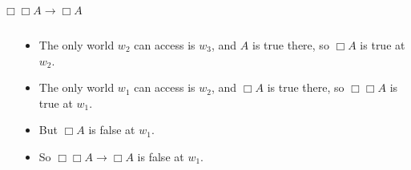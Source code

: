 \documentclass[
  14pt,
  letterpaper,
  ignorenonframetext,
  aspectratio=169,
]{beamer}
\begin{document}
\begin{frame}{\(\Box \Box A \rightarrow \Box A\)}
\protect\hypertarget{box-box-a-rightarrow-box-a}{}
\begin{columns}
    \begin{column}{0.45\textwidth}
    \end{column}
    \begin{column}{0.5\textwidth}
    \begin{itemize}
    \item The only world $w_2$ can access is $w_3$, and $A$ is true there, so $\Box A$ is true at $w_2$.
    \item The only world $w_1$ can access is $w_2$, and $\Box A$ is true there, so $\Box \Box A$ is true at $w_1$.
    \item But $\Box A$ is false at $w_1$.
    \item So $\Box \Box A \rightarrow \Box A$ is false at $w_1$.
    \end{itemize}
  \end{column}
\end{columns}
\end{frame}
\end{document}

